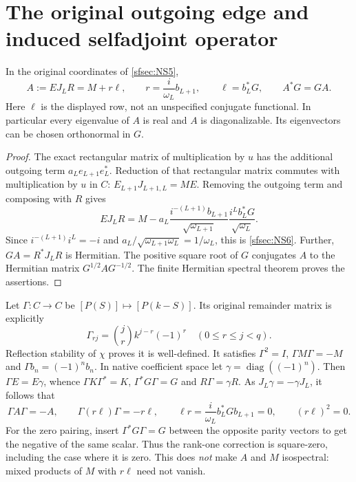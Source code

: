 \section{The original outgoing edge and induced selfadjoint operator}

\begin{sfsectheorem}\label{sfsec:thm:receiver}
In the original coordinates of \eqref{sfsec:NS5},
\begin{equation}\tag{NS6}\label{sfsec:NS6}
A:=EJ_LR=M+r\ell,\qquad
r=\frac{i}{\omega_L}b_{L+1},\qquad
\ell=b_L^*G,\qquad A^*G=GA .
\end{equation}
Here $\ell$ is the displayed row, not an unspecified
conjugate functional. In particular every eigenvalue of $A$
is real and $A$ is diagonalizable. Its eigenvectors can be
chosen orthonormal in $G$.
\end{sfsectheorem}
\begin{proof}
The exact rectangular matrix of multiplication by $u$ has
the additional outgoing term $a_Le_{L+1}e_L^*$.
Reduction of that rectangular matrix commutes with
multiplication by $u$ in $C$:
$E_{L+1}J_{L+1,L}=ME$. Removing the outgoing term and
composing with $R$ gives
\[
EJ_LR=M-a_L\frac{i^{-(L+1)}b_{L+1}}{\sqrt{\omega_{L+1}}}
              \frac{i^Lb_L^*G}{\sqrt{\omega_L}}.
\]
Since $i^{-(L+1)}i^L=-i$ and
$a_L/\sqrt{\omega_{L+1}\omega_L}=1/\omega_L$,
this is \eqref{sfsec:NS6}. Further,
$GA=R^*J_LR$ is Hermitian. The positive square root of $G$
conjugates $A$ to the Hermitian matrix $G^{1/2}AG^{-1/2}$.
The finite Hermitian spectral theorem proves the assertions.
\end{proof}

Let $\Gamma:C\to C$ be $[P(S)]\mapsto[P(k-S)]$.
Its original remainder matrix is explicitly
\begin{equation}\tag{NS7}\label{sfsec:NS7}
\Gamma_{rj}=\binom jr k^{j-r}(-1)^r\quad(0\leq r\leq j<q).
\end{equation}
Reflection stability of $\chi$ proves it is well-defined.
It satisfies $\Gamma^2=I$, $\Gamma M\Gamma=-M$ and
$\Gamma b_n=(-1)^nb_n$.
In native coefficient space let $\gamma=\operatorname{diag}((-1)^n)$.
Then $\Gamma E=E\gamma$, whence
$\Gamma K\Gamma^*=K$, $\Gamma^*G\Gamma=G$ and
$R\Gamma=\gamma R$. As $J_L\gamma=-\gamma J_L$, it follows that
\begin{equation}\tag{NS8}\label{sfsec:NS8}
\Gamma A\Gamma=-A,\qquad
\Gamma(r\ell)\Gamma=-r\ell,\qquad
\ell r=\frac{i}{\omega_L}b_L^*Gb_{L+1}=0,\qquad
(r\ell)^2=0 .
\end{equation}
For the zero pairing, insert $\Gamma^*G\Gamma=G$ between the
opposite parity vectors to get the negative of the same scalar.
Thus the rank-one correction is square-zero, including the
case where it is zero. This does \emph{not} make $A$ and $M$
isospectral: mixed products of $M$ with $r\ell$ need not vanish.

